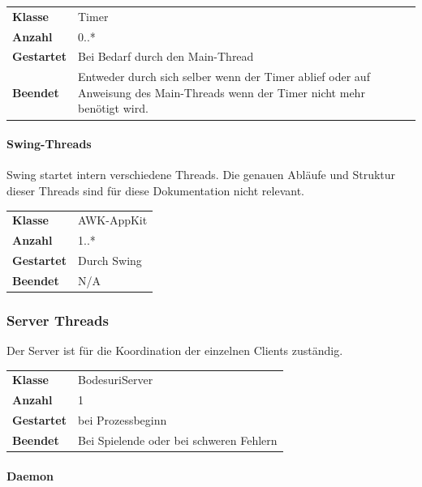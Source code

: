 \documentclass[12pt,halfparskip]{scrartcl}
\begin{document}
\begin{tabular}{@{} l p{12.5cm}}
\textbf{Klasse}       & Timer \\
\textbf{Anzahl}       & 0..* \\
\textbf{Gestartet}    & Bei Bedarf durch den Main-Thread \\
\textbf{Beendet}      & Entweder durch sich selber wenn der Timer ablief oder auf Anweisung des Main-Threads wenn der Timer nicht mehr benötigt wird. 
\end{tabular}


\paragraph{Swing-Threads} %
\label{ssub:swing_threads}

Swing startet intern verschiedene Threads. Die genauen Abläufe und Struktur dieser Threads sind für diese Dokumentation nicht relevant.

\begin{tabular}{@{} l p{12.5cm}}
\textbf{Klasse}       & AWK-AppKit \\
\textbf{Anzahl}       & 1..* \\
\textbf{Gestartet}    & Durch Swing \\
\textbf{Beendet}      & N/A
\end{tabular}


\clearpage
\subsubsection{Server Threads} %
\label{ssub:server}

Der Server ist für die Koordination der einzelnen Clients zuständig.

\begin{tabular}{@{} l p{12.5cm}}
\textbf{Klasse}       & BodesuriServer \\
\textbf{Anzahl}       & 1 \\
\textbf{Gestartet}    & bei Prozessbeginn \\
\textbf{Beendet}      & Bei Spielende oder bei schweren Fehlern
\end{tabular}


\paragraph{Daemon} %
\label{ssub:daemon}
\end{document}
